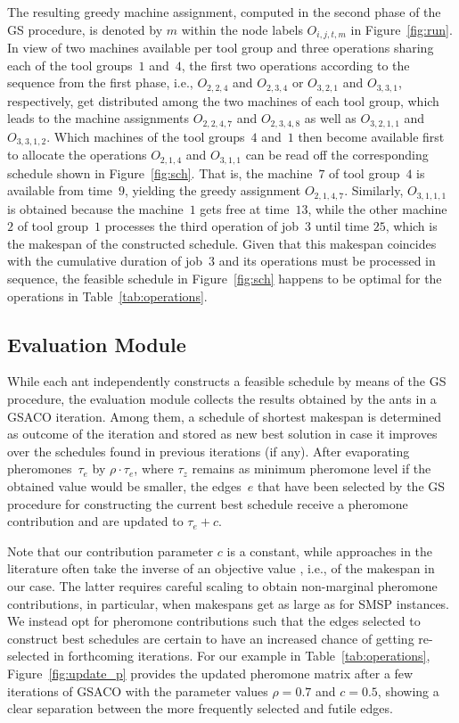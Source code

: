 \documentclass[runningheads]{llncs}
\begin{document}
The resulting greedy machine assignment, computed in the second phase
of the GS procedure, is denoted by $m$ within the node labels $O_{i,j,t,m}$
in Figure~\ref{fig:run}.
In view of two machines available per tool group and three operations sharing each of the tool groups~$1$ and~$4$,
the first two operations according to the sequence from the first phase, i.e., $O_{2,2,4}$ and $O_{2,3,4}$ or $O_{3,2,1}$ and $O_{3,3,1}$, 
respectively, get distributed among the two machines of each tool group,
which leads to the machine assignments
$O_{2,2,4,7}$ and $O_{2,3,4,8}$ as well as $O_{3,2,1,1}$ and $O_{3,3,1,2}$.
Which machines of the tool groups~$4$ and~$1$ then become available first to allocate the operations $O_{2,1,4}$ and $O_{3,1,1}$ can be read off the
corresponding schedule shown in Figure~\ref{fig:sch}.
That is, the machine~$7$ of tool group~$4$ is available from time~$9$,
yielding the greedy assignment $O_{2,1,4,7}$.
Similarly, $O_{3,1,1,1}$
is obtained because the machine~$1$ gets free at time~$13$,
while the other machine~$2$ of tool group~$1$ processes the third operation
of job~$3$ until time $25$, which is the makespan of the constructed schedule.
Given that this makespan coincides with the cumulative duration of job~$3$
and its operations must be processed in sequence, the feasible schedule
in Figure~\ref{fig:sch} happens to be optimal for the operations in Table~\ref{tab:operations}.

\subsection{Evaluation Module}
While each ant independently constructs a feasible schedule by means of the
GS procedure, the evaluation module collects the results obtained
by the ants in a GSACO iteration.
Among them, a schedule of shortest makespan is determined as outcome of the
iteration and stored as new best solution in case it improves over the schedules found in previous iterations (if any).
After evaporating pheromones~$\tau_e$ by $\rho\cdot\tau_e$,
where $\tau_z$ remains as minimum pheromone level if the obtained value
would be smaller,
the edges~$e$ that have been selected by the GS procedure for constructing the current best schedule receive a pheromone contribution and are updated to $\tau_e+c$.

Note that our contribution parameter $c$ is a constant,
while approaches in the literature often take the inverse of an objective value
\cite{turkyilmaz2020research}, i.e., of the makespan in our case.
The latter requires careful scaling to obtain non-marginal
pheromone contributions, in particular, when makespans get as large
as for SMSP instances.
We instead opt for pheromone contributions such that the
edges selected to construct best schedules are certain to have an increased chance
of getting re-selected in forthcoming iterations.
For our example in Table~\ref{tab:operations}, Figure~\ref{fig:update_p} provides the updated pheromone matrix
after a few iterations of GSACO with the parameter values
$\rho=0.7$ and $c=0.5$, showing a clear separation between the more frequently
selected and futile edges.%
\end{document}
